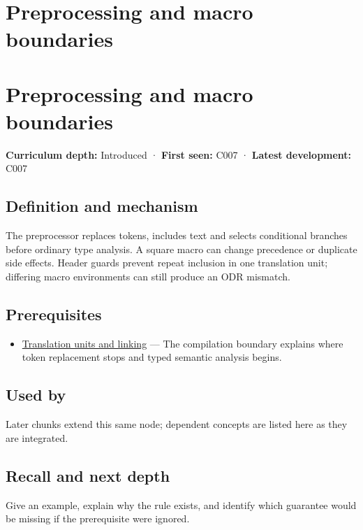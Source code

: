 \hypertarget{appendix-33c0a92ce855}{}
\section*{Preprocessing and macro boundaries}
\section{Preprocessing and macro boundaries}\label{preprocessing-and-macro-boundaries}

\textbf{Curriculum depth:} Introduced · \textbf{First seen:} C007 · \textbf{Latest development:} C007

\subsection{Definition and mechanism}\label{definition-and-mechanism}

The preprocessor replaces tokens, includes text and selects conditional branches before ordinary type analysis. A square macro can change precedence or duplicate side effects. Header guards prevent repeat inclusion in one translation unit; differing macro environments can still produce an ODR mismatch.

\subsection{Prerequisites}\label{prerequisites}

\begin{itemize}
\tightlist
\item
  \hyperref[appendix-806686359e1b]{Translation units and linking} --- The compilation boundary explains where token replacement stops and typed semantic analysis begins.
\end{itemize}

\subsection{Used by}\label{used-by}

Later chunks extend this same node; dependent concepts are listed here as they are integrated.

\subsection{Recall and next depth}\label{recall-and-next-depth}

Give an example, explain why the rule exists, and identify which guarantee would be missing if the prerequisite were ignored.

